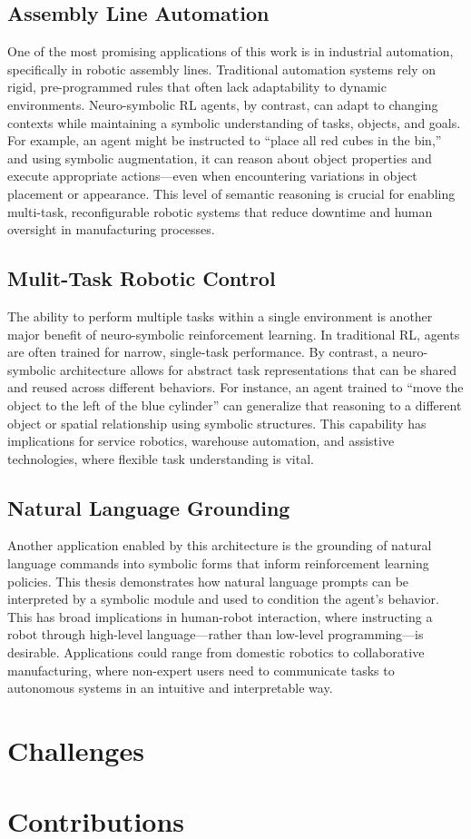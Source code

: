 \subsection{Assembly Line Automation}
One of the most promising applications of this work is in industrial automation, specifically in robotic assembly lines. Traditional automation systems rely on rigid, pre-programmed rules that often lack adaptability to dynamic environments. Neuro-symbolic RL agents, by contrast, can adapt to changing contexts while maintaining a symbolic understanding of tasks, objects, and goals. For example, an agent might be instructed to “place all red cubes in the bin,” and using symbolic augmentation, it can reason about object properties and execute appropriate actions—even when encountering variations in object placement or appearance. This level of semantic reasoning is crucial for enabling multi-task, reconfigurable robotic systems that reduce downtime and human oversight in manufacturing processes.

\subsection{Mulit-Task Robotic Control}
The ability to perform multiple tasks within a single environment is another major benefit of neuro-symbolic reinforcement learning. In traditional RL, agents are often trained for narrow, single-task performance. By contrast, a neuro-symbolic architecture allows for abstract task representations that can be shared and reused across different behaviors. For instance, an agent trained to “move the object to the left of the blue cylinder” can generalize that reasoning to a different object or spatial relationship using symbolic structures. This capability has implications for service robotics, warehouse automation, and assistive technologies, where flexible task understanding is vital.

\subsection{Natural Language Grounding}
Another application enabled by this architecture is the grounding of natural language commands into symbolic forms that inform reinforcement learning policies. This thesis demonstrates how natural language prompts can be interpreted by a symbolic module and used to condition the agent’s behavior. This has broad implications in human-robot interaction, where instructing a robot through high-level language—rather than low-level programming—is desirable. Applications could range from domestic robotics to collaborative manufacturing, where non-expert users need to communicate tasks to autonomous systems in an intuitive and interpretable way.

\section{Challenges} \label{se:challenges}
\section{Contributions} \label{se:contributions}
